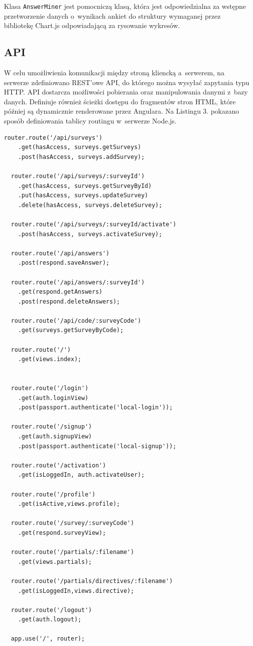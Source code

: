 \documentclass[12pt,a4paper,notitlepage]{article}
\begin{document}
\par Klasa \texttt{AnswerMiner} jest pomocniczą klasą, która jest odpowiedzialna za wstępne przetworzenie danych o~wynikach ankiet do struktury wymaganej przez bibliotekę Chart.js odpowiadającą za rysowanie wykresów.

\subsection{API}
W celu umożliwienia komunikacji między stroną kliencką a~serwerem, na serwerze zdefiniowano REST'owe API, do którego można wysyłać zapytania typu HTTP. API dostarcza możliwości pobierania oraz manipulowania danymi z~bazy danych. Definiuje również ścieżki dostępu do fragmentów stron HTML, które później są dynamicznie renderowane przez Angulara. Na Listingu 3. pokazano sposób definiowania tablicy routingu w~serwerze Node.js.
\begin{lstlisting}[caption=Definicja routingu w~Node.js ]
  router.route('/api/surveys')
    .get(hasAccess, surveys.getSurveys)
    .post(hasAccess, surveys.addSurvey);

  router.route('/api/surveys/:surveyId')
    .get(hasAccess, surveys.getSurveyById)
    .put(hasAccess, surveys.updateSurvey)
    .delete(hasAccess, surveys.deleteSurvey);

  router.route('/api/surveys/:surveyId/activate')
    .post(hasAccess, surveys.activateSurvey);

  router.route('/api/answers')
    .post(respond.saveAnswer);

  router.route('/api/answers/:surveyId')
    .get(respond.getAnswers)
    .post(respond.deleteAnswers);

  router.route('/api/code/:surveyCode')
    .get(surveys.getSurveyByCode);

  router.route('/')
    .get(views.index);


  router.route('/login')
    .get(auth.loginView)
    .post(passport.authenticate('local-login'));

  router.route('/signup')
    .get(auth.signupView)
    .post(passport.authenticate('local-signup'));

  router.route('/activation')
    .get(isLoggedIn, auth.activateUser);

  router.route('/profile')
    .get(isActive,views.profile);

  router.route('/survey/:surveyCode')
    .get(respond.surveyView);

  router.route('/partials/:filename')
    .get(views.partials);

  router.route('/partials/directives/:filename')
    .get(isLoggedIn,views.directive);

  router.route('/logout')
    .get(auth.logout);

  app.use('/', router);
\end{lstlisting}
\end{document}
